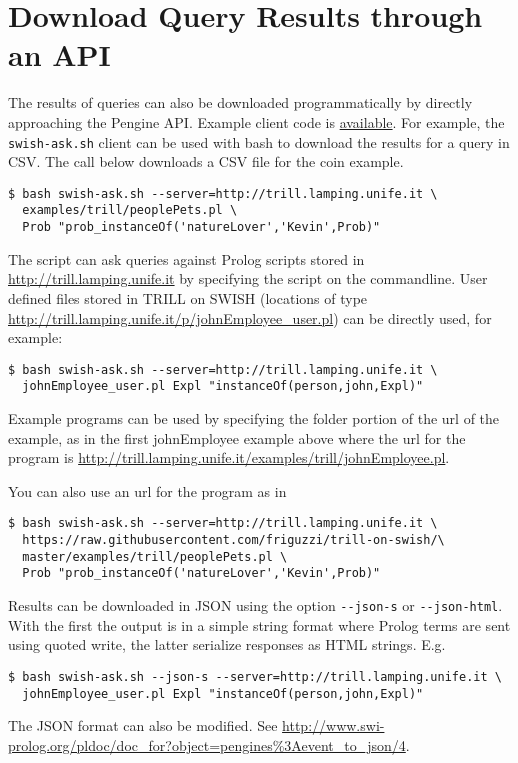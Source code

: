 \documentclass[a4paper,10pt]{scrartcl}
\begin{document}
\section{Download Query Results through an API}
The results of queries can also be downloaded programmatically by directly
approaching the Pengine API. Example client code is 
\href{https://github.com/friguzzi/trill-on-swish/tree/master/client}{available}.  For example, the \verb|swish-ask.sh| client
can be used with bash to download the results for a query in CSV.  The call
below downloads a CSV file for the coin example.
\begin{verbatim}
$ bash swish-ask.sh --server=http://trill.lamping.unife.it \
  examples/trill/peoplePets.pl \
  Prob "prob_instanceOf('natureLover','Kevin',Prob)"
\end{verbatim}
The script can ask queries against Prolog scripts stored in 
\url{http://trill.lamping.unife.it} by specifying
the script on the commandline.  User defined files stored
in TRILL on SWISH (locations of type
\url{http://trill.lamping.unife.it/p/johnEmployee_user.pl}) can
be directly used, for example:
\begin{verbatim}
$ bash swish-ask.sh --server=http://trill.lamping.unife.it \
  johnEmployee_user.pl Expl "instanceOf(person,john,Expl)"
\end{verbatim}
Example programs can be used by specifying the folder portion of the url of the example,
as in the first johnEmployee example above where the url for the program is 
\url{http://trill.lamping.unife.it/examples/trill/johnEmployee.pl}.

You can also use an url for the program as in 
\begin{verbatim}
$ bash swish-ask.sh --server=http://trill.lamping.unife.it \
  https://raw.githubusercontent.com/friguzzi/trill-on-swish/\
  master/examples/trill/peoplePets.pl \
  Prob "prob_instanceOf('natureLover','Kevin',Prob)"
\end{verbatim}
Results can be downloaded in JSON using the option \verb|--json-s| or
\verb|--json-html|.
With the first the output is in a simple string format where Prolog terms are sent using quoted write, the latter serialize responses as HTML strings. E.g.
\begin{verbatim}
$ bash swish-ask.sh --json-s --server=http://trill.lamping.unife.it \
  johnEmployee_user.pl Expl "instanceOf(person,john,Expl)"
\end{verbatim}
The JSON format can also be modified. See
\url{http://www.swi-prolog.org/pldoc/doc_for?object=pengines%3Aevent_to_json/4}.
\end{document}
